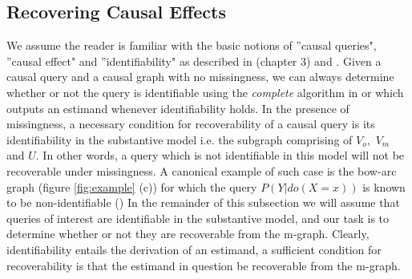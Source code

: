 \documentclass[12pt]{article}
\newtheorem{thm}{Theorem}
\begin{document}
\subsection{Recovering Causal Effects}
\label{sec:causal}

We assume the reader is familiar with the basic notions of
''causal queries", ''causal effect" and ''identifiability" as described in \cite{pearl} (chapter 3) and \cite{pearl:09-r350}.
Given a causal query and a causal graph with no missingness,
we can always determine whether or not the query is identifiable
using the \textit{complete} algorithm
in \cite{ilyabestpaper} or \cite{ huang2006identifiability} which
outputs an estimand whenever identifiability holds.
In the presence of missingness, a necessary condition for
recoverability of a causal query is its identifiability in
the substantive model i.e. the subgraph comprising of
$V_o,$ $V_m$ and $U$. In other words, a query which is not
identifiable in this model will not be recoverable under
missingness. A canonical example of such case is the bow-arc
graph (figure \ref{fig:example} (c)) for which the query $P(Y|do(X=x))$ is known to be
non-identifiable (\cite{pearl}) %
In the remainder of this
subsection  we will assume that queries of interest
are identifiable in the substantive model, and our task is
to determine whether or not they are recoverable from
the m-graph.  Clearly, identifiability entails the
derivation of an estimand, a sufficient condition for
recoverability is that the estimand in question be
recoverable from the m-graph.
\end{document}
